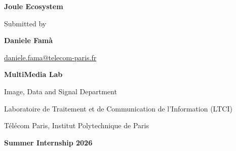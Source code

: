 
\begin{titlepage}

\begin{center}


\vspace*{1.5cm}

{\Huge \textbf{Joule Ecosystem}}

\vspace{1.5cm}


{\large Submitted by}

\vspace{0.4cm}

{\Large \textbf{Daniele Famà}}

\vspace{0.2cm}

\href{mailto:daniele.fama@telecom-paris.fr}
     {daniele.fama@telecom-paris.fr}

\vfill




\vspace{0.7cm}

{\large \textbf{MultiMedia Lab}}

\vspace{0.2cm}

{\large Image, Data and Signal Department}

\vspace{0.2cm}

{\large
Laboratoire de Traitement et de Communication de l'Information
(LTCI)
}

\vspace{0.5cm}

Télécom Paris, Institut Polytechnique de Paris

\vfill


{\large \textbf{Summer Internship 2026}}

\vspace{1.0cm}

\end{center}

\end{titlepage}
